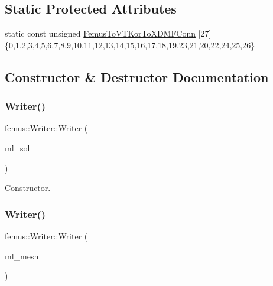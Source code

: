 \subsection*{Static Protected Attributes}
\begin{DoxyCompactItemize}
\item 
static const unsigned \mbox{\hyperlink{classfemus_1_1_writer_af18cf51782e282ca67f508117a06c5e4}{Femus\+To\+V\+T\+Kor\+To\+X\+D\+M\+F\+Conn}} \mbox{[}27\mbox{]} = \{0,1,2,3,4,5,6,7,8,9,10,11,12,13,14,15,16,17,18,19,23,21,20,22,24,25,26\}
\end{DoxyCompactItemize}


\subsection{Constructor \& Destructor Documentation}
\mbox{\label{classfemus_1_1_writer_aab7c838f3993d52a347bdf35a76c2085}} 
\subsubsection{\texorpdfstring{Writer()}{Writer()}\hspace{0.1cm}{\footnotesize\ttfamily [1/2]}}
{\footnotesize\ttfamily femus\+::\+Writer\+::\+Writer (\begin{DoxyParamCaption}\item[{\mbox{\hyperlink{classfemus_1_1_multi_level_solution}{Multi\+Level\+Solution}} $\ast$}]{ml\+\_\+sol }\end{DoxyParamCaption})}

Constructor. \mbox{\label{classfemus_1_1_writer_ad6429c1b9ee2ecc9b684596fce5e05ca}} 
\subsubsection{\texorpdfstring{Writer()}{Writer()}\hspace{0.1cm}{\footnotesize\ttfamily [2/2]}}
{\footnotesize\ttfamily femus\+::\+Writer\+::\+Writer (\begin{DoxyParamCaption}\item[{\mbox{\hyperlink{classfemus_1_1_multi_level_mesh}{Multi\+Level\+Mesh}} $\ast$}]{ml\+\_\+mesh }\end{DoxyParamCaption})}

